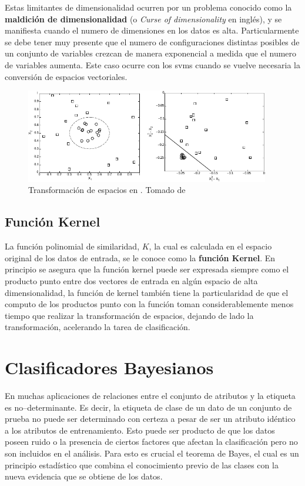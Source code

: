 Estas limitantes de dimensionalidad ocurren por un problema conocido como la \textbf{maldición de dimensionalidad} (o \textsl{Curse of dimensionality} en inglés), y se manifiesta cuando el numero de dimensiones en los datos es alta. Particularmente se debe tener muy presente que el numero de configuraciones distintas posibles de un conjunto de variables crezcan de manera exponencial a medida que el numero de variables aumenta. Este caso ocurre con los \glspl{svm} cuando se vuelve necesaria la conversión de espacios vectoriales.

\begin{figure}[H]
\centering
\includegraphics[width=0.95\textwidth]{Figures/svm-nonlinear-transform.pdf}
\decoRule
\caption[Transformación de espacios en ]{Transformación de espacios en . Tomado de \cite{tan2005introduction}}
\label{fig:svm-nonlinear-transforms}
\end{figure}

\subsection{Función Kernel}
La función polinomial de similaridad, $K$, la cual es calculada en el espacio original de los datos de entrada, se le conoce como la \textbf{función Kernel}. En principio se asegura que la función kernel puede ser expresada siempre como el producto punto entre dos vectores de entrada en algún espacio de alta dimensionalidad, la función de kernel también tiene la particularidad de que el computo de los productos punto con la función toman considerablemente menos tiempo que realizar la transformación de espacios, dejando de lado la transformación, acelerando la tarea de clasificación.


\section{Clasificadores Bayesianos} \label{sec:bayes}
En muchas aplicaciones de relaciones entre el conjunto de atributos y la etiqueta es no--determinante. Es decir, la etiqueta de clase de un dato de un conjunto de prueba no puede ser determinado con certeza a pesar de ser un atributo idéntico a los atributos de entrenamiento. Esto puede ser producto de que los datos poseen ruido o la presencia de ciertos factores que afectan la clasificación pero no son incluidos en el análisis. Para esto es crucial el teorema de Bayes, el cual es un principio estadístico que combina el conocimiento previo de las clases con la nueva evidencia que se obtiene de los datos.

